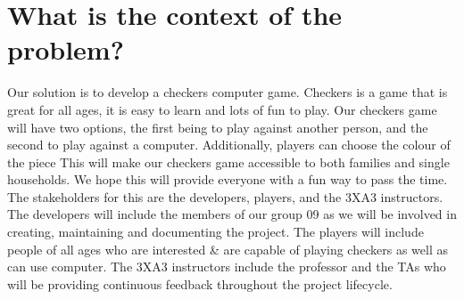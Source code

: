 \documentclass{article}
\begin{document}
\section{What is the context of the problem?}
Our solution is to develop a checkers computer game. Checkers is a game that is great for all ages, it is easy to learn and lots of fun to play. Our checkers game will have two options, the first being to play against another person, and the second to play against a computer. {\color{blue} Additionally, players can choose the colour of the piece} This will make our checkers game accessible to both families and single households. We hope this will provide everyone with a fun way to pass the time. The stakeholders for this are the developers, players, and the 3XA3 instructors. The developers will include the members of our group 09 as we will be involved in creating, maintaining and documenting the project. The players will include people of all ages who are interested \& are capable of playing checkers {\color{blue} as well as can use computer}. The 3XA3 instructors include the professor and the TAs who will be providing continuous feedback throughout the project lifecycle.
\end{document}
